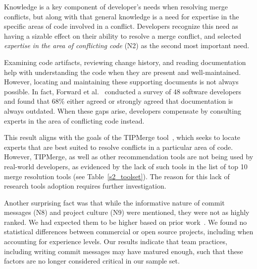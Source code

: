 Knowledge is a key component of developer's needs when resolving merge conflicts, but along with that general knowledge is a need for expertise in the specific areas of code involved in a conflict.
Developers recognize this need as having a sizable effect on their ability to resolve a merge conflict, and selected \textit{expertise in the area of conflicting code} (N2) as the second most important need.

Examining code artifacts, reviewing change history, and reading documentation help with understanding the code when they are present and well-maintained.
However, locating and maintaining these supporting documents is not always possible.
In fact, Forward et al.~\cite{forward2002documentation} conducted a survey of 48 software developers and found that 68\% either agreed or strongly agreed that documentation is always outdated.
When these gaps arise, developers compensate by consulting experts in the area of conflicting code instead.

This result aligns with the goals of the TIPMerge tool~\cite{CostaSarma}, which seeks to locate experts that are best suited to resolve conflicts in a particular area of code.
However, TIPMerge, as well as other recommendation tools are not being used by real-world developers, as evidenced by the lack of such tools in the list of top 10 merge resolution tools (see Table~\ref{s2_toolset}).
The reason for this lack of research tools adoption requires further investigation.

Another surprising fact was that while the informative nature of commit messages (N8) and project culture (N9) were mentioned, they were not as highly ranked. %
We had expected them to be higher based on prior work~\cite{yamauchi2014clustering, hindle2009automatic, cortes2014automatically, hattori2008nature}. 
We found no statistical differences between commercial or open source projects, including when accounting for experience levels.
Our results indicate that team practices, including writing commit messages may have matured enough, such that these factors are no longer considered critical in our sample set. 



